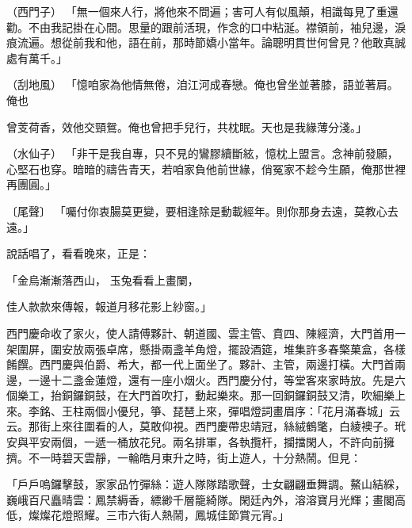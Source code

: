 （西門子）  「無一個來人行，將他來不問遍；害可人有似風顛，相識每見了重還勸。不由我記掛在心間。思量的跟前活現，作念的口中粘涎。襟領前，袖兒邊，淚痕流遍。想從前我和他，語在前，那時節嬌小當年。論聰明貫世何曾見？他敢真誠處有萬千。」

（刮地風）  「憶咱家為他情無倦，洎江河成春戀。俺也曾坐並著膝，語並著肩。俺也

曾芰荷香，效他交頸鴛。俺也曾把手兒行，共枕眠。天也是我緣薄分淺。」

（水仙子）  「非干是我自專，只不見的鸞膠續斷絃，憶枕上盟言。念神前發願，心堅石也穿。暗暗的禱告青天，若咱家負他前世緣，俏冤家不趁今生願，俺那世裡再團圓。」

〔尾聲〕  「囑付你衷腸莫更變，要相逢除是動載經年。則你那身去遠，莫教心去遠。」

說話唱了，看看晚來，正是：

「金烏漸漸落西山，  玉兔看看上畫闌，

佳人款款來傳報，報道月移花影上紗窗。」

西門慶命收了家火，使人請傅夥計、朝道國、雲主管、賁四、陳經濟，大門首用一架圍屏，圍安放兩張卓席，懸掛兩盞羊角燈，擺設酒筵，堆集許多春檠菓盒，各樣餚饌。西門慶與伯爵、希大，都一代上面坐了。夥計、主管，兩邊打橫。大門首兩邊，一邊十二盞金蓮燈，還有一座小烟火。西門慶分付，等堂客來家時放。先是六個樂工，抬銅鑼銅鼓，在大門首吹打，動起樂來。那一回銅鑼銅鼓又清，吹細樂上來。李銘、王柱兩個小優兒，箏、琵琶上來，彈唱燈詞畫眉序：「花月滿春城」云云。那街上來往圍看的人，莫敢仰視。西門慶帶忠靖冠，絲絨鶴氅，白綾襖子。玳安與平安兩個，一遞一桶放花兒。兩名排軍，各執攬杆，攔擋閑人，不許向前擁擠。不一時碧天雲靜，一輪皓月東升之時，街上遊人，十分熱鬧。但見：

「戶戶嗚鑼擊鼓，家家品竹彈絲：遊人隊隊踏歌聲，士女翩翩垂舞調。鰲山結綵，巍峨百尺矗晴雲：鳳禁縟香，縹緲千層籠綺隊。閑廷內外，溶溶寶月光輝；畫閣高低，燦燦花燈照耀。三市六街人熱鬧，鳳城佳節賞元宵。」


